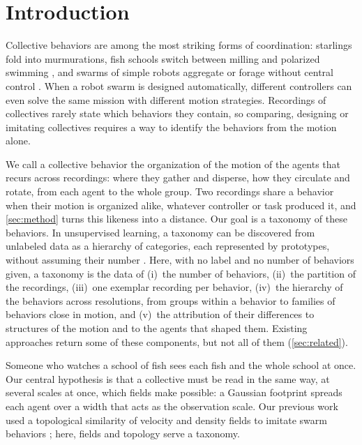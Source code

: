 \documentclass[pdflatex,sn-apa]{sn-jnl}
\begin{document}
\section{Introduction}
\label{sec:intro}

Collective behaviors are among the most striking forms of coordination: starlings fold into murmurations, fish schools
switch between milling and polarized swimming \citep{tunstrom2013collective}, and swarms of simple robots aggregate or
forage without central control \citep{brambilla2013swarm}. When a robot swarm is designed
automatically, different controllers can even solve the same mission with different motion strategies. Recordings of
collectives rarely state which behaviors they contain, so comparing, designing or imitating collectives requires a way
to identify the behaviors from the motion alone.

We call a collective behavior the organization of the motion of the agents that recurs across recordings: where they
gather and disperse, how they circulate and rotate, from each agent to the whole group. Two recordings share a
behavior when their motion is organized alike, whatever controller or task produced it, and \cref{sec:method} turns
this likeness into a distance. Our goal is a taxonomy of these behaviors. In unsupervised learning, a taxonomy can be discovered from unlabeled data
as a hierarchy of categories, each represented by prototypes, without assuming their number
\citep{wang2025deep}. Here, with no label and no number of behaviors given, a taxonomy is the data of (i)~the
number of behaviors, (ii)~the partition of the recordings, (iii)~one exemplar recording per behavior, (iv)~the
hierarchy of the behaviors across resolutions, from groups within a behavior to families of behaviors close in motion,
and (v)~the attribution of their differences to structures of the motion and to the agents that shaped them. Existing
approaches return some of these components, but not all of them (\cref{sec:related}).

Someone who watches a school of fish sees each fish and the whole school at once. Our central hypothesis is that a
collective must be read in the same way, at several scales at once, which fields make possible: a Gaussian footprint
spreads each agent over a width that acts as the observation scale. Our previous work used a topological similarity of velocity and
density fields to imitate swarm behaviors \citep{ndinga2025thesis}; here, fields and topology serve a taxonomy.
\end{document}
